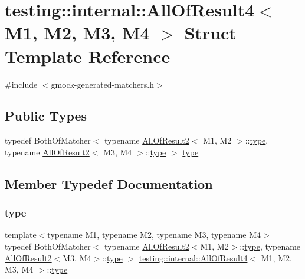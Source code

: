 \hypertarget{structtesting_1_1internal_1_1AllOfResult4}{}\section{testing\+::internal\+::All\+Of\+Result4$<$ M1, M2, M3, M4 $>$ Struct Template Reference}
\label{structtesting_1_1internal_1_1AllOfResult4}


{\ttfamily \#include $<$gmock-\/generated-\/matchers.\+h$>$}

\subsection*{Public Types}
\begin{DoxyCompactItemize}
\item 
typedef Both\+Of\+Matcher$<$ typename \mbox{\hyperlink{structtesting_1_1internal_1_1AllOfResult2}{All\+Of\+Result2}}$<$ M1, M2 $>$\+::\mbox{\hyperlink{structtesting_1_1internal_1_1AllOfResult4_ab277e20178bac632d4e5a39a1a407bbf}{type}}, typename \mbox{\hyperlink{structtesting_1_1internal_1_1AllOfResult2}{All\+Of\+Result2}}$<$ M3, M4 $>$\+::\mbox{\hyperlink{structtesting_1_1internal_1_1AllOfResult4_ab277e20178bac632d4e5a39a1a407bbf}{type}} $>$ \mbox{\hyperlink{structtesting_1_1internal_1_1AllOfResult4_ab277e20178bac632d4e5a39a1a407bbf}{type}}
\end{DoxyCompactItemize}


\subsection{Member Typedef Documentation}
\mbox{\label{structtesting_1_1internal_1_1AllOfResult4_ab277e20178bac632d4e5a39a1a407bbf}} 
\subsubsection{\texorpdfstring{type}{type}}
{\footnotesize\ttfamily template$<$typename M1, typename M2, typename M3, typename M4$>$ \\
typedef Both\+Of\+Matcher$<$ typename \mbox{\hyperlink{structtesting_1_1internal_1_1AllOfResult2}{All\+Of\+Result2}}$<$M1, M2$>$\+::\mbox{\hyperlink{structtesting_1_1internal_1_1AllOfResult4_ab277e20178bac632d4e5a39a1a407bbf}{type}}, typename \mbox{\hyperlink{structtesting_1_1internal_1_1AllOfResult2}{All\+Of\+Result2}}$<$M3, M4$>$\+::\mbox{\hyperlink{structtesting_1_1internal_1_1AllOfResult4_ab277e20178bac632d4e5a39a1a407bbf}{type}} $>$ \mbox{\hyperlink{structtesting_1_1internal_1_1AllOfResult4}{testing\+::internal\+::\+All\+Of\+Result4}}$<$ M1, M2, M3, M4 $>$\+::\mbox{\hyperlink{structtesting_1_1internal_1_1AllOfResult4_ab277e20178bac632d4e5a39a1a407bbf}{type}}}



